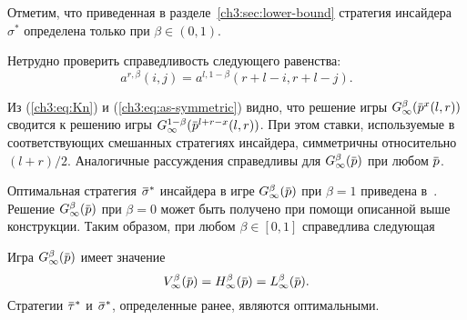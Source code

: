 {Отметим, что приведенная в разделе~\ref{ch3:sec:lower-bound} стратегия инсайдера $\sigma^*$ определена только при $\beta \in (0, 1)$.

Нетрудно проверить справедливость следующего равенства:
\begin{equation}
  \label{ch3:eq:as-symmetric}
  a^{r, \beta}(i, j) = a^{l, 1-\beta}(r+l-i, r+l-j).
\end{equation}

Из (\ref{ch3:eq:Kn}) и (\ref{ch3:eq:as-symmetric}) видно, что решение игры $\theG[\infty](\p^x(l, r))$ сводится к решению игры $G^{1-\beta}_\infty(\p^{l+r-x}(l,r))$.
При этом ставки, используемые в соответствующих смешанных стратегиях инсайдера, симметричны относительно $(l+r)/2$.
Аналогичные рассуждения справедливы для $\theG[\infty](\p)$ при любом $\p$.

Оптимальная стратегия $\sigmav^*$ инсайдера в игре $\theG[\infty](\p)$ при $\beta = 1$ приведена в~\cite{domansky11}.
Решение $\theG[\infty](\p)$ при $\beta = 0$ может быть получено при помощи описанной выше конструкции.
Таким образом, при любом $\beta \in [0, 1]$ справедлива следующая
\begin{theorem}
  Игра $\theG[\infty](\p)$ имеет значение
  \[
    \V[\infty](\p) = \High(\p) = \Low(\p).
  \]
  Стратегии $\tauv^*$ и $\sigmav^*$, определенные ранее, являются оптимальными.
\end{theorem}

    

}
